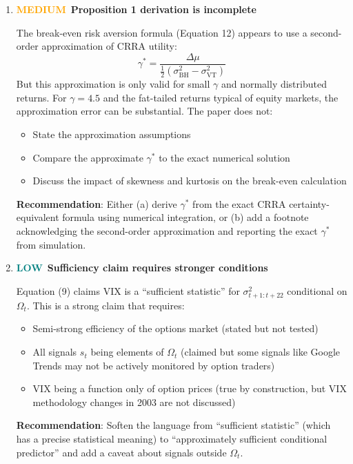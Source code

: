 \documentclass[12pt,a4paper]{article}
\newcommand{\MEDIUM}{\textcolor{orange}{\textbf{MEDIUM}}}
\newcommand{\LOW}{\textcolor{teal}{\textbf{LOW}}}
\begin{document}
\begin{enumerate}[label=D6.\arabic*]

\item \MEDIUM\ \textbf{Proposition 1 derivation is incomplete}

The break-even risk aversion formula (Equation 12) appears to use a second-order approximation of CRRA utility:
$$\gamma^* = \frac{\Delta \mu}{\frac{1}{2}(\sigma_{\text{BH}}^2 - \sigma_{\text{VT}}^2)}$$
But this approximation is only valid for small $\gamma$ and normally distributed returns. For $\gamma = 4.5$ and the fat-tailed returns typical of equity markets, the approximation error can be substantial. The paper does not:
\begin{itemize}
    \item State the approximation assumptions
    \item Compare the approximate $\gamma^*$ to the exact numerical solution
    \item Discuss the impact of skewness and kurtosis on the break-even calculation
\end{itemize}
\textbf{Recommendation}: Either (a) derive $\gamma^*$ from the exact CRRA certainty-equivalent formula using numerical integration, or (b) add a footnote acknowledging the second-order approximation and reporting the exact $\gamma^*$ from simulation.

\item \LOW\ \textbf{Sufficiency claim requires stronger conditions}

Equation (9) claims VIX is a ``sufficient statistic'' for $\sigma^2_{t+1:t+22}$ conditional on $\Omega_t$. This is a strong claim that requires:
\begin{itemize}
    \item Semi-strong efficiency of the options market (stated but not tested)
    \item All signals $s_t$ being elements of $\Omega_t$ (claimed but some signals like Google Trends may not be actively monitored by option traders)
    \item VIX being a function only of option prices (true by construction, but VIX methodology changes in 2003 are not discussed)
\end{itemize}
\textbf{Recommendation}: Soften the language from ``sufficient statistic'' (which has a precise statistical meaning) to ``approximately sufficient conditional predictor'' and add a caveat about signals outside $\Omega_t$.

\end{enumerate}
\end{document}
